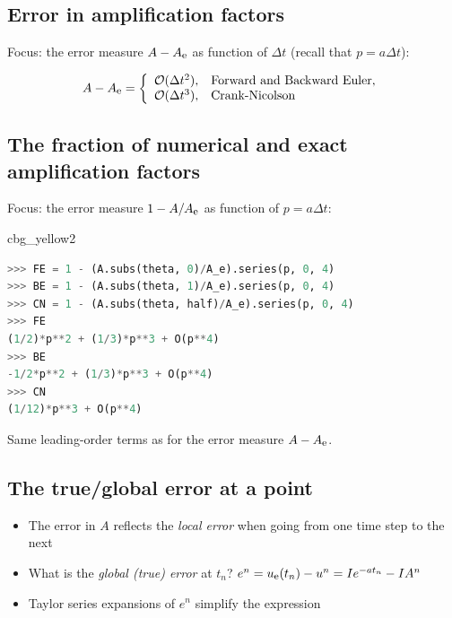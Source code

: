\documentclass[%
oneside,                 %
final,                   %
10pt]{article}
\newenvironment{_cod_tight}[1]{
   \def\FrameCommand{\colorbox{#1}}
   \FrameRule0.6pt\MakeFramed {\FrameRestore}\vskip3mm}
   {\vskip0mm\endMakeFramed}
\newenvironment{cod}[1]{
\bgroup\rmfamily
\fboxsep=0mm\relax
\begin{_cod_tight}{#1}
\list{}{\parsep=-2mm\parskip=0mm\topsep=0pt\leftmargin=2mm
\rightmargin=2\leftmargin\leftmargin=4pt\relax}
\item\relax}
{\endlist\end{_cod_tight}\egroup}
\begin{document}
\subsection*{Error in amplification factors}

Focus: the error measure $A-\Aex$ as function of $\Delta t$ (recall that $p=a\Delta t$):

\begin{equation}
A-\Aex = \left\lbrace\begin{array}{ll}
\Oof{\Delta t^2}, & \hbox{Forward and Backward Euler},\\ 
\Oof{\Delta t^3}, & \hbox{Crank-Nicolson}
\end{array}\right.
\end{equation}

\subsection*{The fraction of numerical and exact amplification factors}

Focus: the error measure $1-A/\Aex$ as function of $p=a\Delta t$:

\begin{cod}{cbg_yellow2}\begin{lstlisting}[language=Python,style=simple,xleftmargin=2mm]
>>> FE = 1 - (A.subs(theta, 0)/A_e).series(p, 0, 4)
>>> BE = 1 - (A.subs(theta, 1)/A_e).series(p, 0, 4)
>>> CN = 1 - (A.subs(theta, half)/A_e).series(p, 0, 4)
>>> FE
(1/2)*p**2 + (1/3)*p**3 + O(p**4)
>>> BE
-1/2*p**2 + (1/3)*p**3 + O(p**4)
>>> CN
(1/12)*p**3 + O(p**4)
\end{lstlisting}\end{cod}
\noindent
Same leading-order terms as for the error measure $A-\Aex$.

\subsection*{The true/global error at a point}
\label{decay:analysis:gobal:error}

\begin{itemize}
 \item The error in $A$ reflects the \emph{local error} when going from one
   time step to the next

 \item What is the \emph{global (true) error} at $t_n$?
   $e^n = \uex(t_n) - u^n = Ie^{-at_n} - IA^n$

 \item Taylor series expansions of $e^n$ simplify the expression
\end{itemize}
\end{document}
